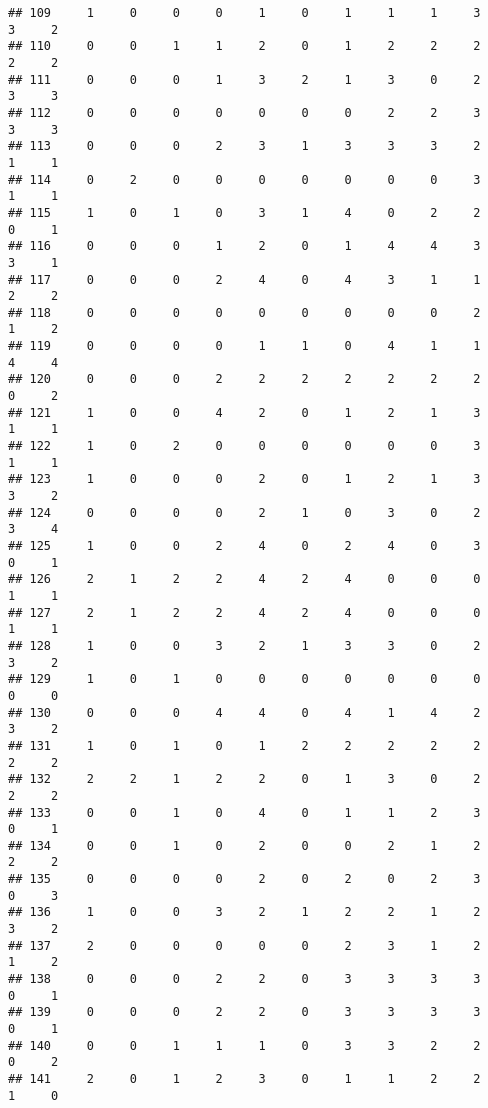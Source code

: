 \documentclass[
]{article}
\begin{document}
\begin{verbatim}
## 109     1     0     0     0     1     0     1     1     1     3     3     2
## 110     0     0     1     1     2     0     1     2     2     2     2     2
## 111     0     0     0     1     3     2     1     3     0     2     3     3
## 112     0     0     0     0     0     0     0     2     2     3     3     3
## 113     0     0     0     2     3     1     3     3     3     2     1     1
## 114     0     2     0     0     0     0     0     0     0     3     1     1
## 115     1     0     1     0     3     1     4     0     2     2     0     1
## 116     0     0     0     1     2     0     1     4     4     3     3     1
## 117     0     0     0     2     4     0     4     3     1     1     2     2
## 118     0     0     0     0     0     0     0     0     0     2     1     2
## 119     0     0     0     0     1     1     0     4     1     1     4     4
## 120     0     0     0     2     2     2     2     2     2     2     0     2
## 121     1     0     0     4     2     0     1     2     1     3     1     1
## 122     1     0     2     0     0     0     0     0     0     3     1     1
## 123     1     0     0     0     2     0     1     2     1     3     3     2
## 124     0     0     0     0     2     1     0     3     0     2     3     4
## 125     1     0     0     2     4     0     2     4     0     3     0     1
## 126     2     1     2     2     4     2     4     0     0     0     1     1
## 127     2     1     2     2     4     2     4     0     0     0     1     1
## 128     1     0     0     3     2     1     3     3     0     2     3     2
## 129     1     0     1     0     0     0     0     0     0     0     0     0
## 130     0     0     0     4     4     0     4     1     4     2     3     2
## 131     1     0     1     0     1     2     2     2     2     2     2     2
## 132     2     2     1     2     2     0     1     3     0     2     2     2
## 133     0     0     1     0     4     0     1     1     2     3     0     1
## 134     0     0     1     0     2     0     0     2     1     2     2     2
## 135     0     0     0     0     2     0     2     0     2     3     0     3
## 136     1     0     0     3     2     1     2     2     1     2     3     2
## 137     2     0     0     0     0     0     2     3     1     2     1     2
## 138     0     0     0     2     2     0     3     3     3     3     0     1
## 139     0     0     0     2     2     0     3     3     3     3     0     1
## 140     0     0     1     1     1     0     3     3     2     2     0     2
## 141     2     0     1     2     3     0     1     1     2     2     1     0

\end{verbatim}
\end{document}

